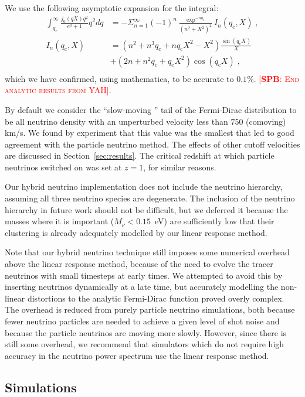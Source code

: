 \documentclass[useAMS, usenatbib]{mnras}
\newcommand{\spb}[1]{{\textsc{\textcolor{red}{[{\bf SPB}: #1]}}}}
\begin{document}
We use the following asymptotic expansion for the integral:
\begin{align}
 \int^\infty_{q_\mathrm{c}} \frac{j_0(qX) q^2}{e^q + 1} q^2 dq &= - \Sigma^{\infty}_{n=1} (-1)^n \frac{\exp^{-n q_\mathrm{c}}}{(n^2+X^2)^2} I_n(q_\mathrm{c},X) \;,\\
 I_n(q_\mathrm{c},X) &= (n^2 + n^3 q_\mathrm{c} + n q_\mathrm{c} X^2 - X^2) \frac{\sin(q_\mathrm{c} X)}{X} \\
 &+ (2n + n^2 q_\mathrm{c} + q_\mathrm{c} X^2) \cos(q_\mathrm{c} X)\;,\\
\end{align}
which we have confirmed, using mathematica, to be accurate to $0.1\%$.
\spb{End analytic results from YAH}.

By default we consider the ``slow-moving '' tail of the Fermi-Dirac distribution to be all neutrino density with an unperturbed velocity less than $750$ (comoving) km/s. We found by experiment that this value was the smallest that led to good agreement 
with the particle neutrino method. The effects of other cutoff velocities are discussed in Section~\ref{sec:results}.
The critical redshift at which particle neutrinos switched on was set at $z=1$, for similar reasons.

Our hybrid neutrino implementation does not include the neutrino hierarchy, assuming all three neutrino species are degenerate. The inclusion of the neutrino hierarchy in future work should not be difficult, but we deferred it because the masses where it is important ($M_\nu < 0.15$~eV) are sufficiently low that their clustering is already adequately modelled by our linear response method.

Note that our hybrid neutrino technique still imposes some numerical overhead above the linear response method, because of the need to evolve the tracer neutrinos with small timesteps at early times. We attempted to avoid this by inserting neutrinos dynamically at a late time, but accurately modelling the non-linear distortions to the analytic Fermi-Dirac function proved overly complex. The overhead is reduced from purely particle neutrino simulations, both because fewer neutrino particles are needed to achieve a given level of shot noise and because the particle neutrinos are moving more slowly. However, since there is still some overhead, we recommend that simulators which do not require high accuracy in the neutrino power spectrum use the linear response method.

\subsection{Simulations}
\label{sec:simulations}
\end{document}
